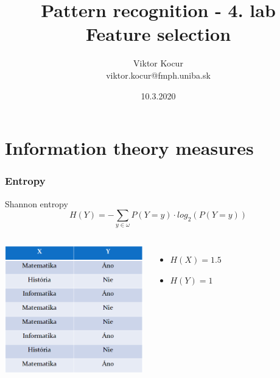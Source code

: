 \documentclass{beamer}
\title[Feature selection]{Pattern recognition - 4. lab \\ Feature selection}
\author[Viktor Kocur]{Viktor Kocur \\{\small viktor.kocur@fmph.uniba.sk}}
\institute{DAI FMFI UK}
\date{10.3.2020}
\begin{document}

\begin{frame}[plain]
  \titlepage  
\end{frame}

\section{Information theory measures}

\begin{frame}
\frametitle{Entropy}
  \centering
  Shannon entropy
  \begin{equation*}
  H(Y) = - \sum_{y \in \omega} P(Y = y) \cdot log_2(P(Y = y)) 
  \end{equation*}
  

\begin{columns}[onlytextwidth,T]


  \column{27mm}
  \includegraphics[width=60mm]{tabulka.png}
  
  \column{\dimexpr\linewidth-60mm-6mm}

  \begin{itemize}
  \item<2-> $H(X) = 1.5$
  \item<3-> $H(Y) = 1$
  \end{itemize}
\end{columns}
\end{frame}
\end{document}
